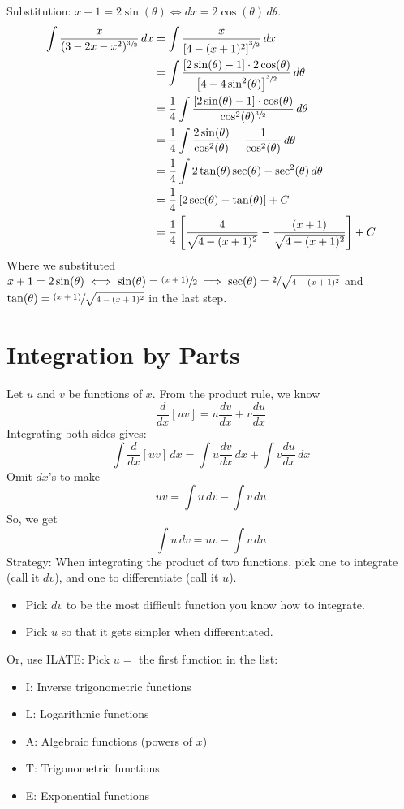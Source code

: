 \begin{Example}{}{}
    Substitution: $ x+1=2\sin(\theta)\iff dx=2\cos(\theta)\,d\theta $.
    \begin{align*}
        \int \frac{x}{(3-2x-x^2)^{\sfrac{3}{2}}} \, d{x}
         & =\int \frac{x}{\left[ 4-(x+1)^2 \right]^{\sfrac{3}{2}}} \, d{x}                                               \\
         & =\int \frac{[2\sin(\theta)-1]\cdot 2\cos(\theta)}{\left[4-4\sin^2(\theta)\right]^{\sfrac{3}{2}}} \, d{\theta} \\
         & =\frac{1}{4} \int \frac{[2\sin(\theta)-1]\cdot \cos(\theta)}{\cos^2(\theta)^{\sfrac{3}{2}}} \, d{\theta}      \\
         & =\frac{1}{4} \int \frac{2\sin(\theta)}{\cos^2(\theta)}-\frac{1}{\cos^2(\theta)} \, d{\theta}                  \\
         & =\frac{1}{4} \int 2\tan(\theta)\sec(\theta)-\sec^2(\theta)\, d{\theta}                                        \\
         & =\frac{1}{4} \left[ 2\sec(\theta)-\tan(\theta) \right]+C                                                      \\
         & =\frac{1}{4} \left[ \frac{4}{\sqrt{4-(x+1)^2}}-\frac{(x+1)}{\sqrt{4-(x+1)^2}} \right]+C
    \end{align*}
    Where we substituted $ x+1=2\sin(\theta)\iff \sin(\theta)=\sfrac{(x+1)}{2}\implies
        \sec(\theta)=\sfrac{2}{\sqrt{4-(x+1)^2}} $ and $ \tan(\theta)=\sfrac{(x+1)}{\sqrt{4-(x+1)^2}} $
    in the last step.
\end{Example}

\section{Integration by Parts}
Let $ u $ and $ v $ be functions of $ x $. From the product rule, we know
\[ \frac{d}{dx}[uv]=u \frac{dv}{dx}+v \frac{du}{dx} \]
Integrating both sides gives:
\[ \int \frac{d}{dx} [uv]\, d{x}=\int u \frac{dv}{dx} \, d{x}+
    \int v \frac{du}{dx} \, d{x}   \]
Omit $ dx $'s to make
\[ uv=\int u\, {dv} -\int v\, d{u} \]
So, we get
\[ \int u\, d{v} =uv-\int v\, d{u} \]
Strategy: When integrating the product of two functions, pick one to
integrate (call it $ dv $), and one to differentiate (call it $ u $).
\begin{itemize}
    \item Pick $ dv $ to be the most difficult function you know how to integrate.
    \item Pick $ u $ so that it gets simpler when differentiated.
\end{itemize}
Or, use ILATE\@: Pick $ u= $ the first function in the list:
\begin{itemize}
    \item I\@: Inverse trigonometric functions
    \item L\@: Logarithmic functions
    \item A\@: Algebraic functions (powers of $ x $)
    \item T\@: Trigonometric functions
    \item E\@: Exponential functions
\end{itemize}

